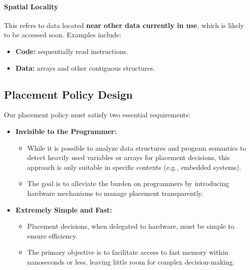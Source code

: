 \paragraph{Spatial Locality} This refers to data located \textbf{near other data currently in use}, which is likely to be accessed soon. Examples include:
\begin{itemize}
    \item \textbf{Code:} sequentially read instructions.
    \item \textbf{Data:} arrays and other contiguous structures.
\end{itemize}

\subsection{Placement Policy Design}

Our placement policy must satisfy two essential requirements:

\begin{itemize}
    \item \textbf{Invisible to the Programmer:}
    \begin{itemize}
        \item While it is possible to analyze data structures and program semantics to detect heavily used variables or arrays for placement decisions, this approach is only suitable in specific contexts (e.g., embedded systems).
        \item The goal is to alleviate the burden on programmers by introducing hardware mechanisms to manage placement transparently.
    \end{itemize}
    \item \textbf{Extremely Simple and Fast:}
    \begin{itemize}
        \item Placement decisions, when delegated to hardware, must be simple to ensure efficiency.
        \item The primary objective is to facilitate access to fast memory within nanoseconds or less, leaving little room for complex decision-making.
    \end{itemize}
\end{itemize}
\newpage
